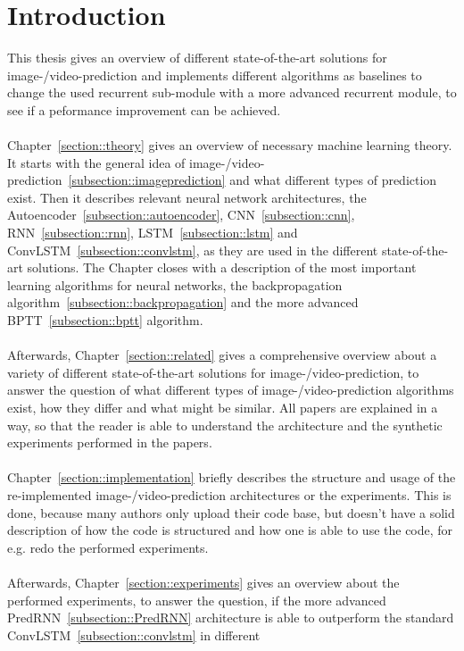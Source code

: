 \section{Introduction} \label{section::introduction}
 This thesis gives an overview of different state-of-the-art solutions for image-/video-prediction and implements different algorithms as baselines to change the 
 used recurrent sub-module with a more advanced recurrent module, to see if a peformance improvement can be achieved.
 \\\\
 Chapter~\ref{section::theory} gives an overview of necessary machine learning theory. It starts with the general idea of
 image-/video-prediction~\ref{subsection::imageprediction} and what different types of prediction exist. Then it describes relevant neural network architectures, the 
 Autoencoder~\ref{subsection::autoencoder}, CNN~\ref{subsection::cnn}, RNN~\ref{subsection::rnn}, LSTM~\ref{subsection::lstm} and
 ConvLSTM~\ref{subsection::convlstm}, as they are used in the different state-of-the-art solutions. The Chapter closes with
 a description of the most important learning algorithms for neural networks, the backpropagation algorithm~\ref{subsection::backpropagation} and the more advanced 
 BPTT~\ref{subsection::bptt} algorithm.
 \\\\
 Afterwards, Chapter~\ref{section::related} gives a comprehensive overview about a variety of different state-of-the-art solutions for image-/video-prediction,
 to answer the question of what different types of image-/video-prediction algorithms exist, how they differ and what might be similar. All papers are explained
 in a way, so that the reader is able to understand the architecture and the synthetic experiments performed in the papers.
 \\\\
 Chapter~\ref{section::implementation} briefly describes the structure and usage of the re-implemented image-/video-prediction architectures or the experiments. 
 This is done, because many authors only upload
 their code base, but doesn't have a solid description of how the code is structured and how one is able to use the code, for e.g. redo the performed experiments.
 \\\\
 Afterwards, Chapter~\ref{section::experiments} gives an overview about the performed experiments, to answer the question, if
 the more advanced PredRNN~\ref{subsection::PredRNN} architecture is able to outperform the standard ConvLSTM~\ref{subsection::convlstm} in different
